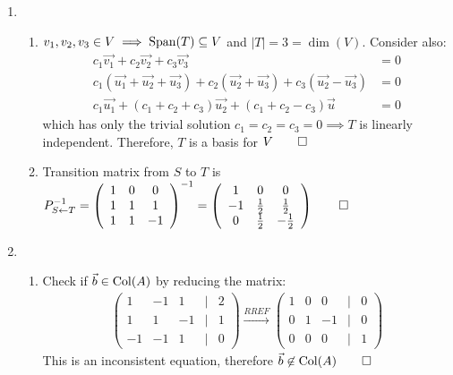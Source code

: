 \documentclass[12pt, a4paper]{article}
\begin{document}
\begin{enumerate}[Q\arabic*.]
    \pagebreak

  \item
    \begin{enumerate}[(\alph*)]
      \item $v_1, v_2, v_3 \in V \implies \operatorname{Span}(T) \subseteq V$ and $|T|=3=\dim(V)$. Consider also:
        \begin{align*}
          c_1 \vec{v_1} + c_2 \vec{v_2} + c_3 \vec{v_3} &= 0\\
          c_1(\vec{u_1} + \vec{u_2} + \vec{u_3}) + c_2(\vec{u_2} + \vec{u_3}) + c_3(\vec{u_2} - \vec{u_3}) &= 0\\
          c_1 \vec{u_1} + (c_1 + c_2 + c_3)\vec{u_2} + (c_1+c_2-c_3)\vec{u} &= 0
        \end{align*}
        which has only the trivial solution $c_1 = c_2 = c_3 = 0 \implies T$ is linearly independent. Therefore, $T$ is a basis for $V \qed$ 

      \item Transition matrix from $S$ to $T$ is $P_{S\leftarrow T}^{-1} = \left(\begin{array}{ccc} 1 & 0 & 0\\ 1 & 1 & 1\\ 1 & 1 & -1 \end{array}\right)^{-1} = \left(\begin{array}{ccc} 1 & 0 & 0\\ -1 & \frac{1}{2} & \frac{1}{2}\\ 0 & \frac{1}{2} & -\frac{1}{2} \end{array}\right) \qed$
    \end{enumerate}

  \item
    \begin{enumerate}[(\alph*)]
      \item Check if $\vec{b} \in \operatorname{Col}(A)$ by reducing the matrix: 
        \begin{align*}
          \left(\begin{array}{ccccc} 1 & -1 & 1 &|& 2\\ 1 & 1 & -1 &|& 1\\ -1 & -1 & 1 &|& 0 \end{array}\right)
          \xrightarrow{RREF}
          \left(\begin{array}{ccccc} 1 & 0 & 0 &|& 0\\ 0 & 1 & -1 &|& 0\\ 0 & 0 & 0 &|& 1 \end{array}\right)
        \end{align*}
        This is an inconsistent equation, therefore $\vec{b} \not\in \operatorname{Col}(A) \qed$


\end{enumerate}
\end{enumerate}
\end{document}
